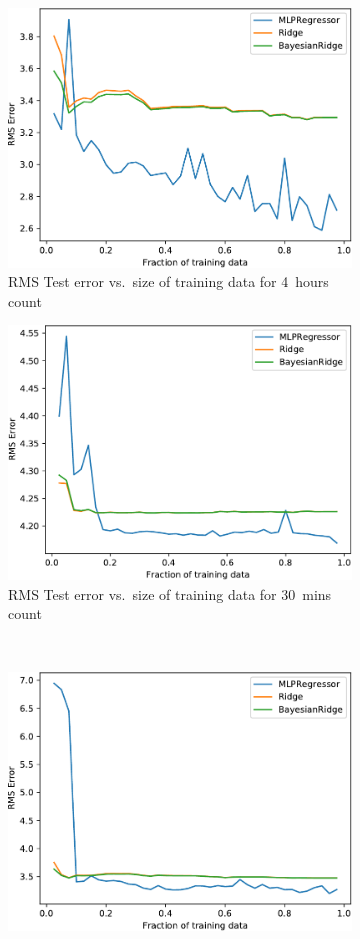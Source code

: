 \begin{figure}[!ht]
\begin{subfigure}[t]{.47\linewidth}
        \includegraphics[width=0.9\linewidth]{./figures/AplotC3.pdf}
        \caption{RMS Test error vs.~size of training data for 4~hours count}\label{AppAplotC3}
    \end{subfigure}\hfill%
    \begin{subfigure}[t]{.47\linewidth}\centering
        \includegraphics[width=0.9\linewidth]{./figures/AplotC4.pdf}
        \caption{RMS Test error vs.~size of training data for 30~mins count}\label{AppAplotC4}
    \end{subfigure}\\[5pt]
    \begin{subfigure}[t]{.47\linewidth}\centering
        \includegraphics[width=0.9\linewidth]{./figures/AplotC5.pdf}

\end{subfigure}
\end{figure}
